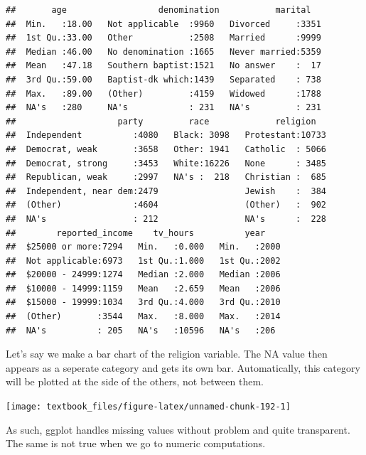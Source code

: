 \documentclass[]{tufte-book}
\newenvironment{Shaded}{}{}
\newcommand{\KeywordTok}[1]{\textcolor[rgb]{0.00,0.44,0.13}{\textbf{#1}}}
\newcommand{\NormalTok}[1]{#1}
\newcommand{\OperatorTok}[1]{\textcolor[rgb]{0.40,0.40,0.40}{#1}}
\newcommand{\StringTok}[1]{\textcolor[rgb]{0.25,0.44,0.63}{#1}}
\begin{document}
\begin{verbatim}
##       age                  denomination           marital    
##  Min.   :18.00   Not applicable  :9960   Divorced     :3351  
##  1st Qu.:33.00   Other           :2508   Married      :9999  
##  Median :46.00   No denomination :1665   Never married:5359  
##  Mean   :47.18   Southern baptist:1521   No answer    :  17  
##  3rd Qu.:59.00   Baptist-dk which:1439   Separated    : 738  
##  Max.   :89.00   (Other)         :4159   Widowed      :1788  
##  NA's   :280     NA's            : 231   NA's         : 231  
##                    party         race             religion    
##  Independent          :4080   Black: 3098   Protestant:10733  
##  Democrat, weak       :3658   Other: 1941   Catholic  : 5066  
##  Democrat, strong     :3453   White:16226   None      : 3485  
##  Republican, weak     :2997   NA's :  218   Christian :  685  
##  Independent, near dem:2479                 Jewish    :  384  
##  (Other)              :4604                 (Other)   :  902  
##  NA's                 : 212                 NA's      :  228  
##        reported_income    tv_hours          year     
##  $25000 or more:7294   Min.   :0.000   Min.   :2000  
##  Not applicable:6973   1st Qu.:1.000   1st Qu.:2002  
##  $20000 - 24999:1274   Median :2.000   Median :2006  
##  $10000 - 14999:1159   Mean   :2.659   Mean   :2006  
##  $15000 - 19999:1034   3rd Qu.:4.000   3rd Qu.:2010  
##  (Other)       :3544   Max.   :8.000   Max.   :2014  
##  NA's          : 205   NA's   :10596   NA's   :206
\end{verbatim}

Let's say we make a bar chart of the religion variable. The NA value then appears as a seperate category and gets its own bar. Automatically, this category will be plotted at the side of the others, not between them.

\begin{Shaded}
\end{Shaded}

\texttt{[image: textbook\_files/figure-latex/unnamed-chunk-192-1]}

As such, ggplot handles missing values without problem and quite transparent. The same is not true when we go to numeric computations.
\end{document}
